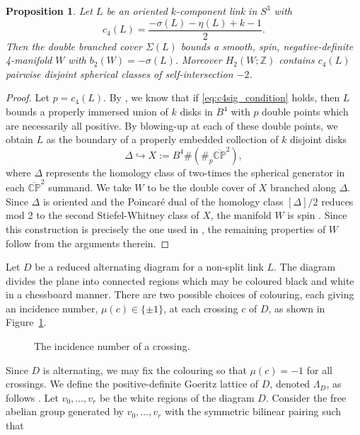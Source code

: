 \documentclass[a4paper,11pt]{amsart}
\newtheorem{prop}[thm]{Proposition}
\theoremstyle{definition}
\theoremstyle{remark}
\numberwithin{equation}{section}
\newcommand{\Z}{\mathbb{Z}}
\newcommand{\CP}{\mathbb{CP}}
\begin{document}
\begin{prop}\label{prop:spinNagelOwens}
Let $L$ be an oriented $k$-component link in $S^3$ with
\begin{equation}\label{eq:c4sig_condition}
    c_4(L) = \frac{-\sigma(L)-\eta(L) +k-1}{2}.
\end{equation}
Then the double branched cover $\Sigma(L)$ bounds a
smooth, spin, negative-definite 4-manifold $W$ with
$b_2(W) = -\sigma(L)$.
Moreover $H_2(W; \Z)$ contains $c_4(L)$ pairwise disjoint spherical
classes of self-intersection $-2$.
\end{prop}
\begin{proof} Let $p=c_4(L)$. 
By \cite[Lemma~2.2]{NagelOwens}, we know that if \eqref{eq:c4sig_condition} holds, then $L$ bounds a properly immersed union of $k$ disks in $B^4$ with $p$ double points which are necessarily all positive. By blowing-up at each of these double points, we obtain $L$ as the boundary of a properly embedded collection of $k$ disjoint disks
\[
\Delta \hookrightarrow X:=B^4\#\left( \#_p \overline{\CP}^2\right),
\]
where $\Delta$ represents the homology class of two-times the spherical generator in each $\overline{\CP}^2$ summand. We take $W$ to be the double cover of $X$ branched along $\Delta$. Since $\Delta$ is oriented and the Poincaré dual of the homology class $[\Delta]/2$ reduces mod 2 to the second Stiefel-Whitney class of $X$, the manifold $W$ is spin \cite{NagamiSpincCovers}. Since this construction is precisely the one used in \cite[Proposition~2.3]{NagelOwens}, the remaining properties of $W$ follow from the arguments therein.
\end{proof}
Let $D$ be a reduced alternating diagram for a non-split link $L$. The diagram divides the plane into connected regions which may be coloured black and white in a chessboard manner. There are two possible choices of colouring, each giving an incidence number, $\mu(c)\in \{\pm 1\}$, at each crossing $c$ of $D$, as shown in Figure~\ref{fig:incidencenumber}.
 \begin{figure}[ht]
   \centering
   
  \caption{The incidence number of a crossing.}
  \label{fig:incidencenumber}
 \end{figure}
 Since $D$ is alternating, we may fix the colouring so that $\mu(c)=-1$ for all crossings. We define the positive-definite Goeritz lattice of $D$, denoted $\Lambda_D$, as follows \cite[Chapter~9]{lickorish1997introduction}. Let $v_0, \dots, v_r$ be the white regions of the diagram $D$. Consider the free abelian group generated by $v_0, \dots, v_r$ with the symmetric bilinear pairing such that
\end{document}
